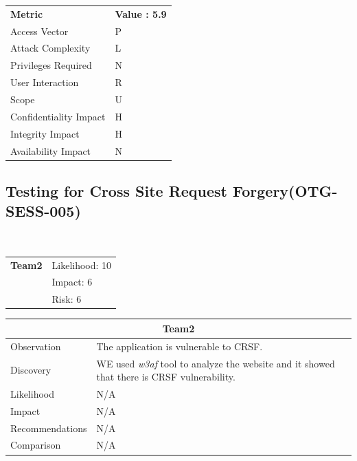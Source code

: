 \documentclass[headsepline,footsepline,footinclude=false,oneside,fontsize=11pt,paper=a4,listof=totoc,bibliography=totoc]{scrbook} %
\begin{document}
\begin{center}
	\begin{tabular}{ll}
		\rowcolor[HTML]{34CDF9}
		{\color[HTML]{ECF4FF} \textbf{Metric}}        & {\color[HTML]{ECF4FF} \textbf{Value : 5.9}} \\
		\rowcolor[HTML]{BBDAFF}
		{\color[HTML]{333333} Access Vector}          & {\color[HTML]{333333} } P             \\
		\rowcolor[HTML]{ECF4FF}
		{\color[HTML]{333333} Attack Complexity}      & {\color[HTML]{333333} } L              \\
		\rowcolor[HTML]{BBDAFF}
		{\color[HTML]{333333} Privileges Required}    & {\color[HTML]{333333} } N              \\
		\rowcolor[HTML]{ECF4FF}
		{\color[HTML]{333333} User Interaction}       & {\color[HTML]{333333} } R              \\
		\rowcolor[HTML]{BBDAFF}
		{\color[HTML]{333333} Scope}                  & {\color[HTML]{333333} } U              \\
		\rowcolor[HTML]{ECF4FF}
		{\color[HTML]{333333} Confidentiality Impact} & {\color[HTML]{333333} } H              \\
		\rowcolor[HTML]{BBDAFF}
		{\color[HTML]{333333} Integrity Impact}       & {\color[HTML]{333333} } H              \\
		\rowcolor[HTML]{ECF4FF}
		{\color[HTML]{333333} Availability Impact}    & {\color[HTML]{333333} } N
	\end{tabular}
\end{center}
\pagebreak
\subsection{Testing for Cross Site Request Forgery(OTG-SESS-005)}\
\begin{tabular}{cR{12cm}}
	\textbf{Team2} & Likelihood: 10\\& Impact: 6\\& Risk: 6
\end{tabular}

\begin{tabular}{ l|p{11cm}  }
	\hline
	\multicolumn{2}{c}{\textbf{Team2}} \\
	\hline
	Observation & The application is vulnerable to CRSF.\\
	Discovery & WE used \textit{w3af} tool to analyze the website and it showed that there is CRSF vulnerability.\\
	Likelihood & N/A\\
	Impact & N/A  \\
	Recommendations & N/A\\
	Comparison & N/A\\
	\hline
\end{tabular}
\end{document}
